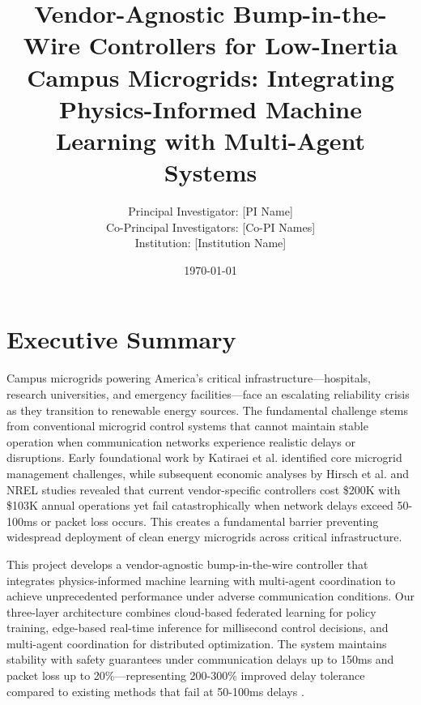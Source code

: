 \documentclass[12pt]{article}
\begin{document}
\title{\Large\textbf{Vendor-Agnostic Bump-in-the-Wire Controllers for Low-Inertia Campus Microgrids: Integrating Physics-Informed Machine Learning with Multi-Agent Systems}}


\author{Principal Investigator: [PI Name]\\
Co-Principal Investigators: [Co-PI Names]\\
Institution: [Institution Name]}

\date{\today}

\maketitle

\section{Executive Summary}

Campus microgrids powering America's critical infrastructure---hospitals, research universities, and emergency facilities---face an escalating reliability crisis as they transition to renewable energy sources. The fundamental challenge stems from conventional microgrid control systems that cannot maintain stable operation when communication networks experience realistic delays or disruptions. Early foundational work by Katiraei et al. \cite{katiraei2008} identified core microgrid management challenges, while subsequent economic analyses by Hirsch et al. \cite{hirsch2018} and NREL studies \cite{sigrin2019} revealed that current vendor-specific controllers cost \$200K with \$103K annual operations yet fail catastrophically when network delays exceed 50-100ms or packet loss occurs. This creates a fundamental barrier preventing widespread deployment of clean energy microgrids across critical infrastructure.

This project develops a vendor-agnostic bump-in-the-wire controller that integrates physics-informed machine learning with multi-agent coordination to achieve unprecedented performance under adverse communication conditions. Our three-layer architecture combines cloud-based federated learning for policy training, edge-based real-time inference for millisecond control decisions, and multi-agent coordination for distributed optimization. The system maintains stability with safety guarantees under communication delays up to 150ms and packet loss up to 20\%—representing 200-300\% improved delay tolerance compared to existing methods that fail at 50-100ms delays \cite{baseline2023delay}.
\end{document}
